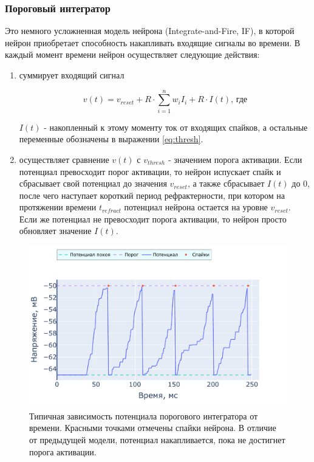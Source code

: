 \documentclass[a4paper]{article}
\begin{document}
\subsubsection{Пороговый интегратор}
Это немного усложненная модель нейрона (Integrate-and-Fire, IF), в которой нейрон приобретает способность накапливать входящие сигналы во времени. В каждый момент времени нейрон осуществляет следующие действия:

\begin{enumerate}
 \item суммирует входящий сигнал

\begin{equation} \label{eq:if}
v(t) = v_{reset} + R \cdot \sum_{i=1}^n {w_i I_i} + R \cdot I(t) \text{, где}
\end{equation}

$I(t)$ - накопленный к этому моменту ток от входящих спайков, а остальные переменные обозначены в выражении \ref{eq:thresh}.

\item осуществляет сравнение $v(t)$ с $v_{thresh}$ - значением порога активации. Если потенциал превосходит порог активации, то нейрон испускает спайк и сбрасывает свой потенциал до значения $v_{reset}$, а также сбрасывает $I(t)$ до 0, после чего наступает короткий период рефрактерности, при котором на протяжении времени $t_{refract}$ потенциал нейрона остается на уровне $v_{reset}$. Если же потенциал не превосходит порога активации, то нейрон просто обновляет значение $I(t)$.
\end{enumerate}

\begin{center}
\begin{figure}[H] 
 \includegraphics[width=\textwidth,keepaspectratio=true]{model_if_ru.pdf}
 \caption{Типичная зависимость потенциала порогового интегратора от времени. Красными точками отмечены спайки нейрона. В отличие от предыдущей модели, потенциал накапливается, пока не достигнет порога активации.}
\end{figure}
\end{center} 
\end{document}
